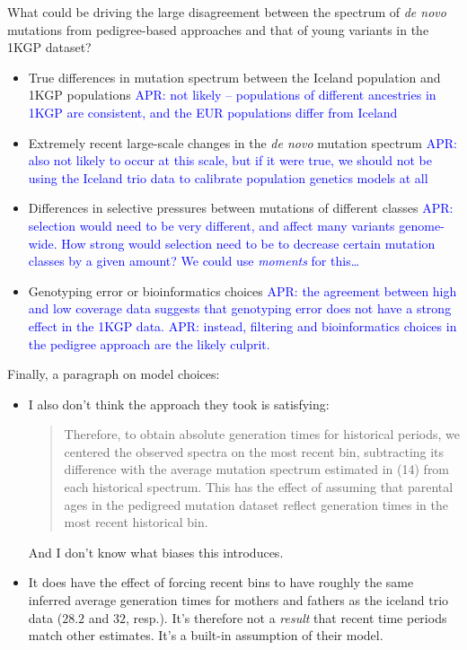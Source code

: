 \documentclass[]{article}
\newcommand{\aprcomment}[1]{{\textcolor{blue}{APR: #1}}}
\begin{document}
What could be driving the large disagreement between the spectrum of \emph{de
novo} mutations from pedigree-based approaches and that of young variants in
the 1KGP dataset?
\begin{itemize}
    \item True differences in mutation spectrum between the Iceland population
        and 1KGP populations \aprcomment{not likely -- populations of different
        ancestries in 1KGP are consistent, and the EUR populations differ from
        Iceland}
    \item Extremely recent large-scale changes in the \emph{de novo} mutation
        spectrum \aprcomment{also not likely to occur at this scale, but if it
        were true, we should not be using the Iceland trio data to calibrate
        population genetics models at all}
    \item Differences in selective pressures between mutations of different
        classes \aprcomment{selection would need to be very different, and
        affect many variants genome-wide. How strong would selection need
        to be to decrease certain mutation classes by a given amount? We could
        use \emph{moments} for this\ldots}
    \item Genotyping error or bioinformatics choices \aprcomment{the agreement
        between high and low coverage data suggests that genotyping error does
        not have a strong effect in the 1KGP data.} \aprcomment{instead, filtering
        and bioinformatics choices in the pedigree approach are the likely
    culprit.} \citep{bergeron2022mutationathon}
\end{itemize}

Finally, a paragraph on model choices:
\begin{itemize}
    \item I also don't think the approach they took is satisfying:
        \begin{quote}
            Therefore, to obtain absolute generation times for historical
            periods, we centered the observed spectra on the most recent bin,
            subtracting its difference with the average mutation spectrum
            estimated in (14) from each historical spectrum.  This has the
            effect of assuming that parental ages in the pedigreed mutation
            dataset reflect generation times in the most recent historical bin.
        \end{quote}
        And I don't know what biases this introduces.
    \item It does have the effect of forcing recent bins to have roughly the
        same inferred average generation times for mothers and fathers as the
        iceland trio data ($28.2$ and $32$, resp.). It's therefore not a
        \emph{result} that recent time periods match other estimates. It's a
        built-in assumption of their model.
\end{itemize}
\end{document}
